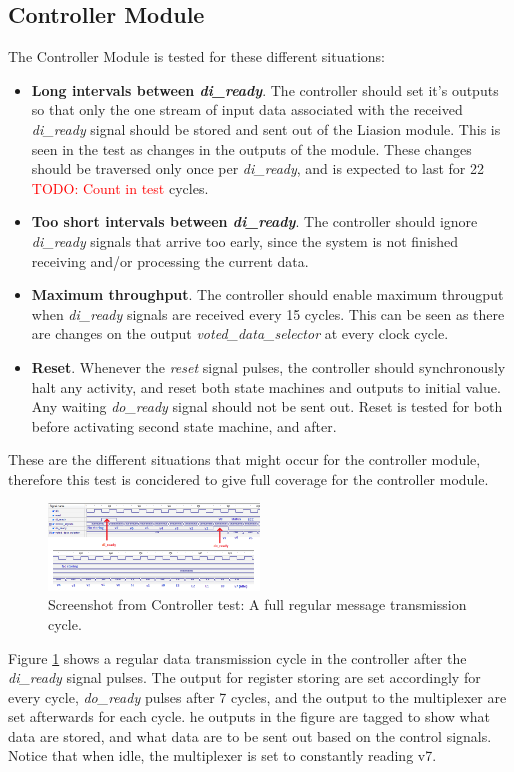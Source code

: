 \documentclass[a4paper]{IEEEtran}
\newcommand\TODO[1]{\textcolor{red}{TODO:#1}}
\newcommand\todo[1]{\TODO{#1}}
\begin{document}
\subsection{ Controller Module}
The Controller Module is tested for these different situations:
\begin{itemize}
    \item \textbf{Long intervals between \textit{di\_ready}}. 
        The controller should set it's outputs so that only the one stream of input data associated with the received \textit{di\_ready} signal should be stored and sent out of the Liasion module.
        This is seen in the test as changes in the outputs of the module.
        These changes should be traversed only once per \textit{di\_ready}, and is expected to last for 22 \todo{ Count in test} cycles.
    \item \textbf{Too short intervals between \textit{di\_ready}}.
        The controller should ignore \textit{di\_ready} signals that arrive too early, since the system is not finished receiving and/or processing the current data.
    \item \textbf{Maximum throughput}.
        The controller should enable maximum througput when \textit{di\_ready} signals are received every 15 cycles.
        This can be seen as there are changes on the output \textit{voted\_data\_selector} at every clock cycle.
    \item \textbf{Reset}.
        Whenever the \textit{reset} signal pulses, the controller should synchronously halt any activity, and reset both state machines and outputs to initial value.
        Any waiting \textit{do\_ready} signal should not be sent out.
        Reset is tested for both before activating second state machine, and after. 
\end{itemize}
These are the different situations that might occur for the controller module, therefore this test is concidered to give full coverage for the controller module.

\begin{figure}[h!]
  \centering
      \includegraphics[width=0.5\textwidth]{Figures/Tests/ControllerRegular}
  \caption{Screenshot from Controller test: A full regular message transmission cycle.}
  \label{fig:ControllerRegular}
\end{figure}
Figure \ref{fig:ControllerRegular} shows a regular data transmission cycle in the controller after the \textit{di\_ready} signal pulses.
The output for register storing are set accordingly for every cycle, \textit{do\_ready} pulses after 7 cycles, and the output to the multiplexer are set afterwards for each cycle. 
he outputs in the figure are tagged to show what data are stored, and what data are to be sent out based on the control signals.
Notice that when idle, the multiplexer is set to constantly reading v7.
\end{document}
